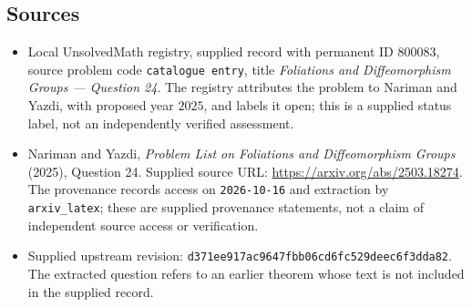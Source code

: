 \documentclass[11pt]{article}
\begin{document}
\subsection{Sources}
\begin{itemize}
\item Local UnsolvedMath registry, supplied record with permanent ID \(800083\), source problem code \texttt{catalogue entry}, title \emph{Foliations and Diffeomorphism Groups --- Question 24}. The registry attributes the problem to Nariman and Yazdi, with proposed year \(2025\), and labels it open; this is a supplied status label, not an independently verified assessment.
\item Nariman and Yazdi, \emph{Problem List on Foliations and Diffeomorphism Groups} (2025), Question 24. Supplied source URL: \url{https://arxiv.org/abs/2503.18274}. The provenance records access on \texttt{2026-10-16} and extraction by \texttt{arxiv\_latex}; these are supplied provenance statements, not a claim of independent source access or verification.
\item Supplied upstream revision: \texttt{d371ee917ac9647fbb06cd6fc529deec6f3dda82}. The extracted question refers to an earlier theorem whose text is not included in the supplied record.
\end{itemize}
\end{document}

